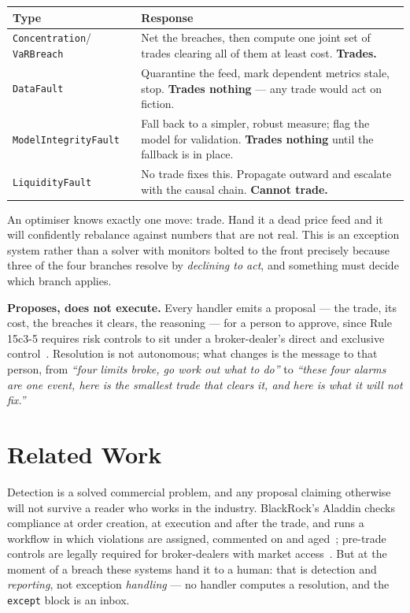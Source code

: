 \documentclass[11pt]{article}
\begin{document}
\begin{center}
\begin{tabular}{@{}>{\raggedright\arraybackslash}p{2.9cm}>{\raggedright\arraybackslash}p{8.8cm}@{}}
\toprule
\textbf{Type} & \textbf{Response} \\
\midrule
\texttt{Concentration}/ \texttt{VaRBreach} & Net the breaches, then compute one joint set
of trades clearing all of them at least cost. \textbf{Trades.} \\
\texttt{DataFault} & Quarantine the feed, mark dependent metrics stale, stop.
\textbf{Trades nothing} --- any trade would act on fiction. \\
\texttt{ModelIntegrity\-Fault} & Fall back to a simpler, robust measure; flag the model
for validation. \textbf{Trades nothing} until the fallback is in place. \\
\texttt{LiquidityFault} & No trade fixes this. Propagate outward and escalate with the
causal chain. \textbf{Cannot trade.} \\
\bottomrule
\end{tabular}
\end{center}

An optimiser knows exactly one move: trade. Hand it a dead price feed and it will confidently
rebalance against numbers that are not real. This is an exception system rather than a solver
with monitors bolted to the front precisely because three of the four branches resolve by
\emph{declining to act}, and something must decide which branch applies.

\textbf{Proposes, does not execute.} Every handler emits a proposal --- the trade, its cost,
the breaches it clears, the reasoning --- for a person to approve, since Rule 15c3-5 requires
risk controls to sit under a broker-dealer's direct and exclusive control~\cite{sec15c35}.
Resolution is not autonomous; what changes is the message to that person, from \emph{``four
limits broke, go work out what to do''} to \emph{``these four alarms are one event, here is
the smallest trade that clears it, and here is what it will not fix.''}

\section{Related Work}

Detection is a solved commercial problem, and any proposal claiming otherwise will not survive
a reader who works in the industry. BlackRock's Aladdin checks compliance at order creation,
at execution and after the trade, and runs a workflow in which violations are assigned,
commented on and aged~\cite{aladdin}; pre-trade controls are legally required for
broker-dealers with market access~\cite{sec15c35}. But at the moment of a breach these
systems hand it to a human: that is detection and \emph{reporting}, not exception
\emph{handling} --- no handler computes a resolution, and the \texttt{except} block is an
inbox.
\end{document}
